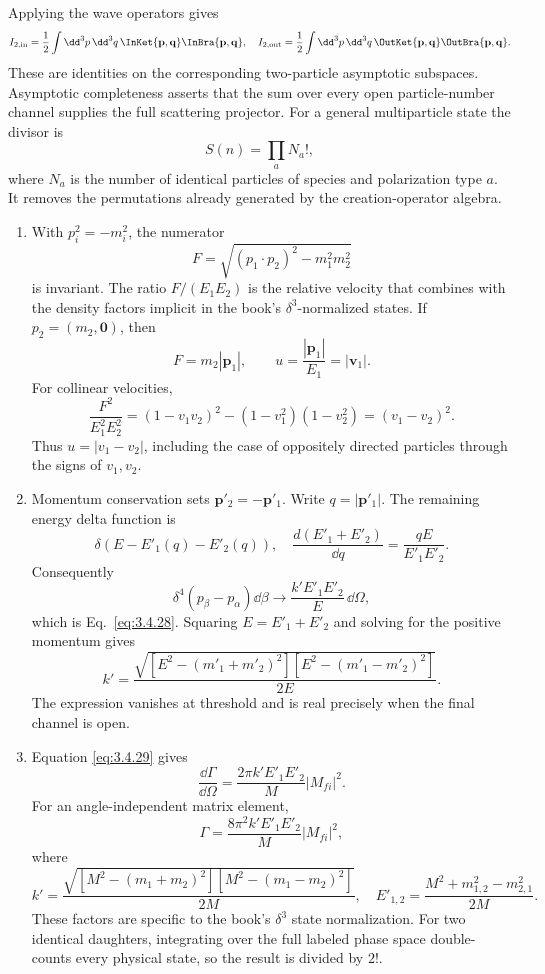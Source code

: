 \begin{enumerate}
Applying the wave operators gives
\[
 I_{2,\rm in}=\frac12\int \dd^3p\,\dd^3q\,
 \InKet{\mathbf p,\mathbf q}\InBra{\mathbf p,\mathbf q},
\quad
 I_{2,\rm out}=\frac12\int \dd^3p\,\dd^3q\,
 \OutKet{\mathbf p,\mathbf q}\OutBra{\mathbf p,\mathbf q}.
\]
These are identities on the corresponding two-particle asymptotic
subspaces.  Asymptotic completeness asserts that the sum over every
open particle-number channel supplies the full scattering projector.
For a general multiparticle state the divisor is
\[
 S(n)=\prod_a N_a!,
\]
where \(N_a\) is the number of identical particles of species and
polarization type \(a\).  It removes the permutations already generated
by the creation-operator algebra.

\begin{enumerate}
\item
With \(p_i^2=-m_i^2\), the numerator
\[
 F=\sqrt{(p_1\cdot p_2)^2-m_1^2m_2^2}
\]
is invariant.  The ratio \(F/(E_1E_2)\) is the relative velocity that
combines with the density factors implicit in the book's
\(\delta^3\)-normalized states.  If \(p_2=(m_2,\mathbf0)\), then
\[
 F=m_2|\mathbf p_1|,\qquad
 u=\frac{|\mathbf p_1|}{E_1}=|\mathbf v_1|.
\]
For collinear velocities,
\[
 \frac{F^2}{E_1^2E_2^2}
 =(1-v_1v_2)^2-(1-v_1^2)(1-v_2^2)
 =(v_1-v_2)^2.
\]
Thus \(u=|v_1-v_2|\), including the case of oppositely directed
particles through the signs of \(v_1,v_2\).
\item
Momentum conservation sets
\(\mathbf p'_2=-\mathbf p'_1\).  Write \(q=|\mathbf p'_1|\).  The
remaining energy delta function is
\[
 \delta(E-E'_1(q)-E'_2(q)),
\quad
 \frac{d(E'_1+E'_2)}{\dd q}
 =\frac{qE}{E'_1E'_2}.
\]
Consequently
\[
 \delta^4(p_\beta-p_\alpha)\dd\beta
 \longrightarrow \frac{k'E'_1E'_2}{E}\,\dd\Omega,
\]
which is Eq.~\eqref{eq:3.4.28}.  Squaring
\(E=E'_1+E'_2\) and solving for the positive momentum gives
\[
 k'=\frac{\sqrt{[E^2-(m'_1+m'_2)^2]
 [E^2-(m'_1-m'_2)^2]}}{2E}.
\]
The expression vanishes at threshold and is real precisely when the
final channel is open.
\item
Equation \eqref{eq:3.4.29} gives
\[
 \frac{\dd\Gamma}{\dd\Omega}
 =\frac{2\pi k'E'_1E'_2}{M}|M_{fi}|^2.
\]
For an angle-independent matrix element,
\[
 \Gamma
 =\frac{8\pi^2k'E'_1E'_2}{M}|M_{fi}|^2,
\]
where
\[
 k'=\frac{\sqrt{[M^2-(m_1+m_2)^2]
 [M^2-(m_1-m_2)^2]}}{2M},
\quad
 E'_{1,2}=\frac{M^2+m_{1,2}^2-m_{2,1}^2}{2M}.
\]
These factors are specific to the book's \(\delta^3\) state normalization.
For two identical daughters, integrating over the full labeled phase
space double-counts every physical state, so the result is divided by
\(2!\).
\end{enumerate}


\end{enumerate}
